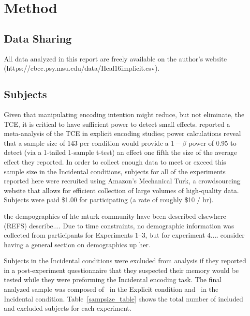 \documentclass[man,natbib,floatsintext]{apa6} %
\begin{document}
\section{Method}

\newcommand\listlength{16} %
\newcommand\presrate{4 seconds} %
\newcommand\isi{1 second} %
\newcommand\DFRDelay{16 second} %
\newcommand\recalltime{75 seconds} %
\newcommand\totalss{XX}
\newcommand\totalexcluded{XX}



\subsection{Data Sharing}All data analyzed in this report are freely available on the author's website (https://cbcc.psy.msu.edu/data/Heal16implicit.csv).

\subsection{Subjects}

Given that manipulating encoding intention might reduce, but not eliminate, the TCE, it is critical to have sufficient power to detect small effects. \citet{SedeEtal10} reported a meta-analysis of the TCE in explicit encoding studies; power calculations reveal that a sample size of 143 per condition would provide a $1-\beta$ power of 0.95 to detect (via a 1-tailed 1-sample t-test) an effect one fifth the size of the average effect they reported. 
In order to collect enough data to meet or exceed this sample size in the Incidental conditions, subjects for all of the experiments reported here were recruited using Amazon's Mechanical Turk, a crowdsourcing website that allows for efficient collection of large volumes of high-quality data. Subjects were paid \$1.00 for participating (a rate of roughly \$10 / hr). 

\label{TODO-10} the dempographics of hte mturk community have been described elsewhere (REFS) describe.... Due to time constraints, no demographic information was collected from participants for Experiments 1--3, but for experiment 4.... consider having a general section on demographics up her. 

Subjects in the Incidental conditions were excluded from analysis if they reported in a post-experiment questionnaire that they suspected their memory would be tested while they were preforming the Incidental encoding task. The final analyzed sample was composed of \shoeExplicitIncluded~in the Explicit condition and \shoeIncidentalIncluded~in the Incidental condition. Table~\ref{sampsize_table} shows the total number of included and excluded subjects for each experiment.
\end{document}
